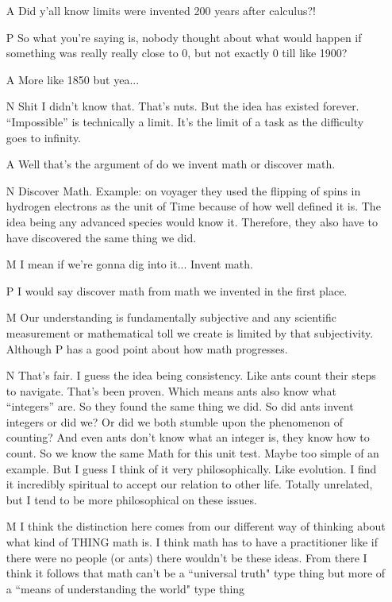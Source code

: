 \documentclass[11pt]{article}
\begin{document}
\begin{multicols}{2}
\begin{enumerate}
	\item[A] Did y'all know limits were invented 200 years after calculus?!
	\item[P] So what you're saying is, nobody thought about what would happen if something was really really close to 0, but not exactly 0 till like 1900?
	\item[A] More like 1850 but yea...
	\item[N] Shit I didn't know that. That's nuts. But the idea has existed forever. ``Impossible'' is technically a limit. It's the limit of a task as the difficulty goes to infinity.
	\item[A] Well that's the argument of do we invent math or discover math.
	\item[N] Discover Math.	Example: on voyager they used the flipping of spins in hydrogen electrons as the unit of Time because of how well defined it is. The idea being any advanced species would know it. Therefore, they also have to have discovered the same thing we did.
	\item[M] I mean if we're gonna dig into it... Invent math.
	\item[P] I would say discover math from math we invented in the first place.
	\item[M] Our understanding is fundamentally subjective and any scientific measurement or mathematical toll we create is limited by that subjectivity. Although P has a good point about how math progresses.
	\item[N] That's fair. I guess the idea being consistency. Like ants count their steps to navigate. That's been proven. Which means ants also know what ``integers” are. So they found the same thing we did. So did ants invent integers or did we? Or did we both stumble upon the phenomenon of counting? And even ants don't know what an integer is, they know how to count. So we know the same Math for this unit test. Maybe too simple of an example. But I guess I think of it very philosophically. Like evolution. I find it incredibly spiritual to accept our relation to other life. Totally unrelated, but I tend to be more philosophical on these issues.
	\item[M] I think the distinction here comes from our different way of thinking about what kind of THING math is. I think math has to have a practitioner like if there were no people (or ants) there wouldn't be these ideas. From there I think it follows that math can't be a ``universal truth" type thing but more of a ``means of understanding the world" type thing

\end{enumerate}
\end{multicols}
\end{document}
